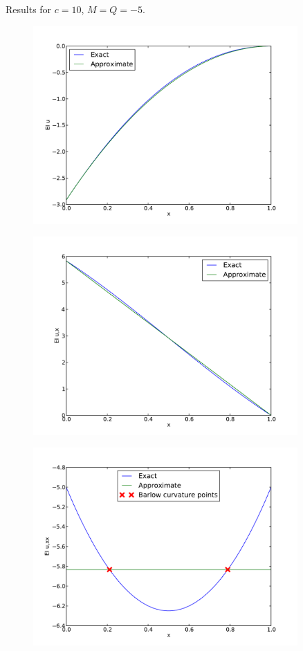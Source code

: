 \documentclass[12pt]{article}
\begin{document}
\clearpage
Results for $c=10$, $M=Q=-5$.
\begin{figure}[h!]
\centering
\includegraphics[width=0.9\textwidth]{u1.pdf}
\end{figure}
\begin{figure}[h!]
\centering
\includegraphics[width=0.9\textwidth]{ux1.pdf}
\end{figure}
\begin{figure}[h!]
\centering
\includegraphics[width=0.9\textwidth]{uxx1.pdf}
\end{figure}
\end{document}
